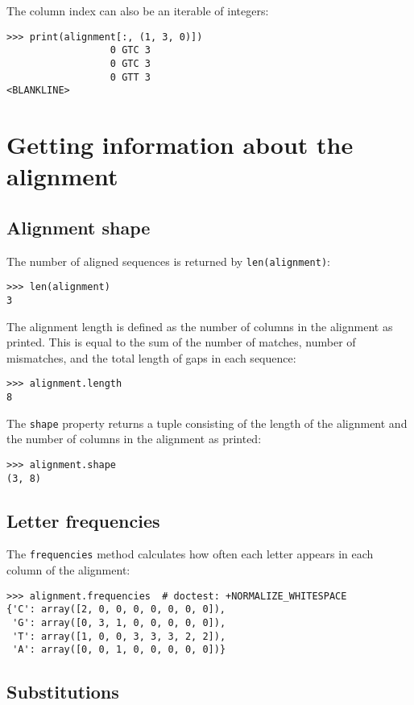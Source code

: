 The column index can also be an iterable of integers:
\begin{verbatim}
>>> print(alignment[:, (1, 3, 0)])
                  0 GTC 3
                  0 GTC 3
                  0 GTT 3
<BLANKLINE>
\end{verbatim}

\section{Getting information about the alignment}

\subsection{Alignment shape}

The number of aligned sequences is returned by \verb+len(alignment)+:
\begin{verbatim}
>>> len(alignment)
3
\end{verbatim}
The alignment length is defined as the number of columns in the alignment as
printed. This is equal to the sum of the number of matches, number of
mismatches, and the total length of gaps in each sequence:
\begin{verbatim}
>>> alignment.length
8
\end{verbatim}

The \verb+shape+ property returns a tuple consisting of the length of the
alignment and the number of columns in the alignment as printed:

\begin{verbatim}
>>> alignment.shape
(3, 8)
\end{verbatim}

\subsection{Letter frequencies}

The \verb+frequencies+ method calculates how often each letter appears in each column of the alignment:
\begin{verbatim}
>>> alignment.frequencies  # doctest: +NORMALIZE_WHITESPACE
{'C': array([2, 0, 0, 0, 0, 0, 0, 0]),
 'G': array([0, 3, 1, 0, 0, 0, 0, 0]),
 'T': array([1, 0, 0, 3, 3, 3, 2, 2]),
 'A': array([0, 0, 1, 0, 0, 0, 0, 0])}
\end{verbatim}

\subsection{Substitutions}

